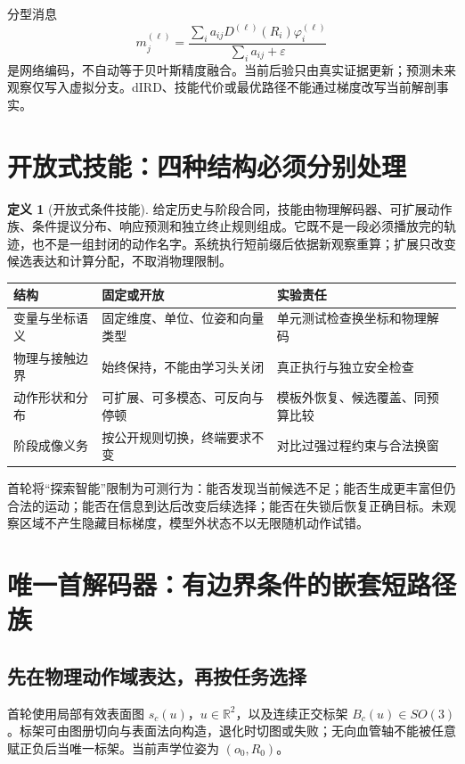 \documentclass[UTF8,fontset=fandol,11pt,a4paper]{ctexart}
\theoremstyle{plain}
\theoremstyle{definition}
\newtheorem{definition}[theorem]{定义}
\theoremstyle{remark}
\numberwithin{equation}{section}
\newcommand{\R}{\mathbb R}
\begin{document}
分型消息
\begin{equation}
m_j^{(\ell)}=\frac{\sum_i a_{ij}D^{(\ell)}(R_i)\varphi_i^{(\ell)}}{\sum_i a_{ij}+\varepsilon}
\end{equation}
是网络编码，不自动等于贝叶斯精度融合。当前后验只由真实证据更新；预测未来观察仅写入虚拟分支。dIRD、技能代价或最优路径不能通过梯度改写当前解剖事实。

\section{开放式技能：四种结构必须分别处理}
\label{sec:open}
\begin{definition}[开放式条件技能]
给定历史与阶段合同，技能由物理解码器、可扩展动作族、条件提议分布、响应预测和独立终止规则组成。它既不是一段必须播放完的轨迹，也不是一组封闭的动作名字。系统执行短前缀后依据新观察重算；扩展只改变候选表达和计算分配，不取消物理限制。
\end{definition}

\begin{table}[htbp]\centering\small
\begin{tabularx}{\linewidth}{P{31mm}YY}\toprule
结构 & 固定或开放 & 实验责任\\\midrule
变量与坐标语义 & 固定维度、单位、位姿和向量类型 & 单元测试检查换坐标和物理解码\\
物理与接触边界 & 始终保持，不能由学习头关闭 & 真正执行与独立安全检查\\
动作形状和分布 & 可扩展、可多模态、可反向与停顿 & 模板外恢复、候选覆盖、同预算比较\\
阶段成像义务 & 按公开规则切换，终端要求不变 & 对比过强过程约束与合法换窗\\\bottomrule
\end{tabularx}
\end{table}

首轮将“探索智能”限制为可测行为：能否发现当前候选不足；能否生成更丰富但仍合法的运动；能否在信息到达后改变后续选择；能否在失锁后恢复正确目标。未观察区域不产生隐藏目标梯度，模型外状态不以无限随机动作试错。

\section{唯一首解码器：有边界条件的嵌套短路径族}
\label{sec:primitive}
\subsection{先在物理动作域表达，再按任务选择}
首轮使用局部有效表面图 $s_c(u)$，$u\in\R^2$，以及连续正交标架 $B_c(u)\in SO(3)$。标架可由图册切向与表面法向构造，退化时切图或失败；无向血管轴不能被任意赋正负后当唯一标架。当前声学位姿为 $(o_0,R_0)$。
\end{document}
